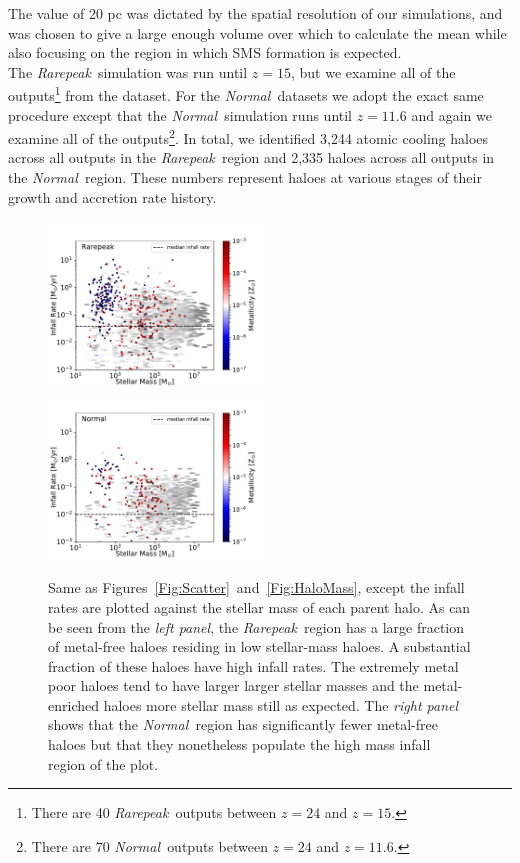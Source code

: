 \documentclass[twocolumn,iop,revtex4]{openjournal}
\newcommand{\rarepeak} {\textit{Rarepeak~}}
\newcommand{\normal} {\textit{Normal~}}
\begin{document}
The value of 20 pc was dictated by the spatial resolution of our simulations, and
%
was chosen to give a large enough
volume over which to calculate the mean while also focusing on the region in which SMS formation is
expected. \\
\indent The \rarepeak simulation was run until $z=15$, but we
examine all of the outputs\footnote{There are 40 \rarepeak outputs between $z = 24$ and $z = 15$.}
from the dataset. For the \normal datasets we adopt the exact same procedure except that
the \normal simulation runs until $z = 11.6$ and again we examine all of the
outputs\footnote{There are 70 \normal outputs between $z = 24$ and $z = 11.6$.}.  In total, we identified
3,244 atomic cooling haloes across all outputs in the \rarepeak region and 2,335
haloes across all outputs in the \normal region. These numbers represent haloes at various stages
of their growth and accretion rate history. 
\begin{figure}
\centering
\begin{minipage}{175mm}      \begin{center} 
\centerline{
\includegraphics[width=0.525\textwidth]{FIGURES/Rarepeak_MdotMstellarZ_Hexbin.pdf}
\includegraphics[width=0.525\textwidth]{FIGURES/Normal_MdotMstellarZ_Hexbin.pdf}}
\caption{Same as Figures~\ref{Fig:Scatter}~and~\ref{Fig:HaloMass}, except
the infall rates are plotted against  the stellar mass of each parent halo. 
 As can be seen from the \textit{left panel}, the \rarepeak region has a large fraction of
  metal-free haloes residing in low stellar-mass haloes. A substantial
  fraction of these haloes have high infall rates. The extremely metal poor haloes tend to have
  larger larger stellar masses and the metal-enriched haloes more stellar mass still as expected. 
  The \textit{right panel} shows that the \normal region has significantly fewer metal-free haloes
  but that they nonetheless populate the high mass infall region of the plot. }
 \label{Fig:StellarMass}
\end{center} \end{minipage}

\end{figure}
\end{document}
